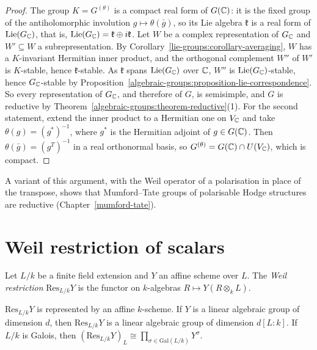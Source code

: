 \begin{proof}
The group $K = G^{(\theta)}$ is a compact real form of $G(\mathbb{C})$: it is the fixed group of the antiholomorphic involution $g \mapsto \theta(\bar g)$, so its Lie algebra $\mathfrak{k}$ is a real
form of $\mathrm{Lie}(G_{\mathbb{C}})$, that is, $\mathrm{Lie}(G_{\mathbb{C}}) = \mathfrak{k} \oplus i\mathfrak{k}$. Let $W$ be a complex representation of $G_{\mathbb{C}}$ and $W' \subseteq W$ a subrepresentation. By
Corollary~\ref{lie-groups:corollary-averaging}, $W$ has a $K$-invariant Hermitian inner product, and the orthogonal complement $W''$ of $W'$ is $K$-stable, hence $\mathfrak{k}$-stable. As
$\mathfrak{k}$ spans $\mathrm{Lie}(G_{\mathbb{C}})$ over $\mathbb{C}$, $W''$ is $\mathrm{Lie}(G_{\mathbb{C}})$-stable, hence $G_{\mathbb{C}}$-stable by Proposition~\ref{algebraic-groups:proposition-lie-correspondence}. So
every representation of $G_{\mathbb{C}}$, and therefore of $G$, is semisimple, and $G$ is reductive by Theorem~\ref{algebraic-groups:theorem-reductive}(1). For the second statement,
extend the inner product to a Hermitian one on $V_{\mathbb{C}}$ and take $\theta(g) = (g^*)^{-1}$, where $g^*$ is the Hermitian adjoint of $g \in G(\mathbb{C})$. Then
$\theta(\bar g) = (g^T)^{-1}$ in a real orthonormal basis, so $G^{(\theta)} = G(\mathbb{C}) \cap U(V_{\mathbb{C}})$, which is compact.
\end{proof}

\begin{remark}\label{algebraic-groups:remark-mumford-tate-reductive}
A variant of this argument, with the Weil operator of a polarisation in place of the transpose, shows that Mumford--Tate groups of polarisable Hodge structures are
reductive (Chapter~\ref{mumford-tate}).
\end{remark}

\section{Weil restriction of scalars}\label{algebraic-groups:section-weil-restriction}

\begin{definition}\label{algebraic-groups:definition-weil-restriction}
Let $L/k$ be a finite field extension and $Y$ an affine scheme over $L$. The \emph{Weil restriction} $\mathrm{Res}_{L/k}Y$ is the functor on $k$-algebras
$R \mapsto Y(R \otimes_kL)$.
\end{definition}

\begin{proposition}\label{algebraic-groups:proposition-weil-restriction}
$\mathrm{Res}_{L/k}Y$ is represented by an affine $k$-scheme. If $Y$ is a linear algebraic group of dimension $d$, then $\mathrm{Res}_{L/k}Y$ is a linear algebraic group of dimension
$d[L : k]$. If $L/k$ is Galois, then $(\mathrm{Res}_{L/k}Y)_L \cong \prod_{\sigma \in \mathrm{Gal}(L/k)}Y^\sigma$.
\end{proposition}

